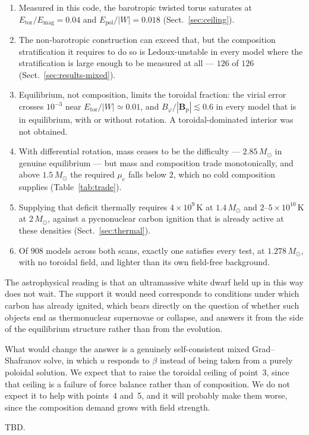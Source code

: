 \documentclass{aa}
\begin{document}
\begin{enumerate}
\item Measured in this code, the barotropic twisted torus saturates at
      $E_{\mathrm{tor}}/E_{\mathrm{mag}} = 0.04$ and
      $E_{\mathrm{pol}}/|W| = 0.018$ (Sect.~\ref{sec:ceiling}).
\item The non-barotropic construction can exceed that, but the
      composition stratification it requires to do so is Ledoux-unstable
      in every model where the stratification is large enough to be
      measured at all --- $126$ of $126$ (Sect.~\ref{sec:results-mixed}).
\item Equilibrium, not composition, limits the toroidal fraction:
      the virial error crosses $10^{-3}$ near
      $E_{\mathrm{tor}}/|W| \simeq 0.01$, and
      $B_\varphi/|\mathbf{B}_{\mathrm{p}}| \lesssim 0.6$ in every model
      that is in equilibrium, with or without rotation. A
      toroidal-dominated interior was not obtained.
\item With differential rotation, mass ceases to be the difficulty ---
      $2.85\,M_\odot$ in genuine equilibrium --- but mass and composition
      trade monotonically, and above $1.5\,M_\odot$ the required $\mu_e$
      falls below $2$, which no cold composition supplies
      (Table~\ref{tab:trade}).
\item Supplying that deficit thermally requires $4\times10^9$\,K at
      $1.4\,M_\odot$ and $2$--$5\times10^{10}$\,K at $2\,M_\odot$,
      against a pycnonuclear carbon ignition that is already active at
      these densities (Sect.~\ref{sec:thermal}).
\item Of $908$ models across both scans, exactly one satisfies every
      test, at $1.278\,M_\odot$, with no toroidal field, and lighter than
      its own field-free background.
\end{enumerate}

The astrophysical reading is that an ultramassive white dwarf held up in
this way does not wait. The support it would need corresponds to
conditions under which carbon has already ignited, which bears directly
on the question of whether such objects end as thermonuclear supernovae
or collapse, and answers it from the side of the equilibrium structure
rather than from the evolution.

What would change the answer is a genuinely self-consistent mixed
Grad--Shafranov solve, in which $u$ responds to $\beta$ instead of being
taken from a purely poloidal solution. We expect that to raise the
toroidal ceiling of point~3, since that ceiling is a failure of force
balance rather than of composition. We do not expect it to help with
points~4 and~5, and it will probably make them worse, since the
composition demand grows with field strength.

\begin{acknowledgements}
TBD.
\end{acknowledgements}



\end{document}
